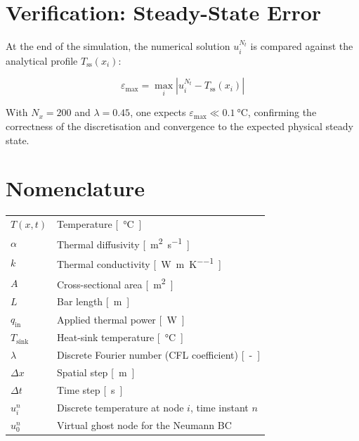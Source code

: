 \documentclass[11pt, a4paper]{scrartcl}
\begin{document}
\begin{onehalfspace}
\section{Verification: Steady-State Error}

At the end of the simulation, the numerical solution $u_i^{N_t}$ is compared against the analytical profile $T_\text{ss}(x_i)$:

\begin{equation}
  \varepsilon_\text{max} = \max_{i} \left| u_i^{N_t} - T_\text{ss}(x_i) \right|
\end{equation}

With $N_x = 200$ and $\lambda = 0.45$, one expects $\varepsilon_\text{max} \ll \SI{0.1}{\celsius}$, confirming the correctness of the discretisation and convergence to the expected physical steady state.

\appendix
\section{Nomenclature}

\begin{tabular}{>{\bfseries}ll}
$T(x,t)$         & Temperature \si{[\celsius]}\\
$\alpha$         & Thermal diffusivity \si{[\meter\squared\per\second]}\\
$k$              & Thermal conductivity \si{[\watt\per\meter\per\kelvin]}\\
$A$              & Cross-sectional area \si{[\meter\squared]}\\
$L$              & Bar length \si{[\meter]}\\
$q_\text{in}$    & Applied thermal power \si{[\watt]}\\
$T_\text{sink}$  & Heat-sink temperature \si{[\celsius]}\\
$\lambda$        & Discrete Fourier number (CFL coefficient) \si{[-]}\\
$\Delta x$       & Spatial step \si{[\meter]}\\
$\Delta t$       & Time step \si{[\second]}\\
$u_i^n$          & Discrete temperature at node $i$, time instant $n$\\
$u_0^n$          & Virtual ghost node for the Neumann BC\\
\end{tabular}

\end{onehalfspace}
\end{document}
